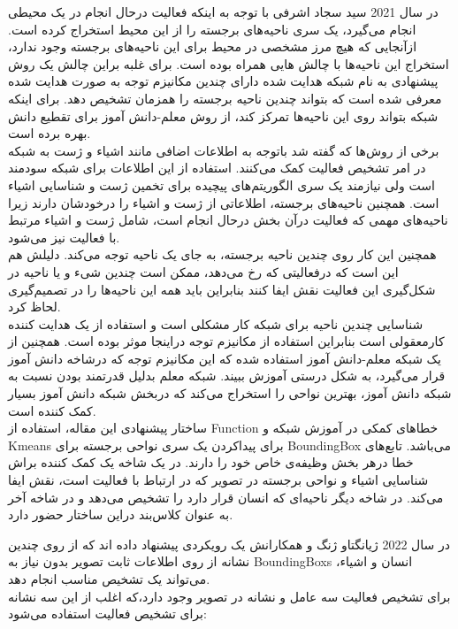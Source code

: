 در سال 2021 سید سجاد اشرفی %
\cite{action_multi_att_weakly}
با توجه به اینکه فعالیت درحال انجام در یک محیطی انجام می‌گیرد، یک سری ناحیه‌های برجسته را از این محیط استخراج کرده است. ازآنجایی که هیچ مرز مشخصی در محیط برای این ناحیه‌های برجسته وجود ندارد،‌ استخراج این ناحیه‌ها با چالش هایی همراه بوده است. برای غلبه براین چالش یک روش پیشنهادی به نام شبکه هدایت شده دارای چندین مکانیزم توجه به صورت هدایت شده معرفی شده است که بتواند چندین ناحیه برجسته را همزمان تشخیص دهد.
 برای اینکه شبکه بتواند روی این ناحیه‌ها تمرکز کند، از روش معلم-دانش آموز برای تقطیع دانش بهره برده است. \\
 برخی از روش‌ها که گفته شد باتوجه به اطلاعات اضافی مانند اشیاء و ژست به شبکه در امر تشخیص فعالیت کمک می‌کنند. استفاده از این اطلاعات برای شبکه سودمند است ولی نیازمند یک سری الگوریتم‌های پیچیده برای تخمین ژست و شناسایی اشیاء است. همچنین ناحیه‌های برجسته، اطلاعاتی از ژست و اشیاء را درخودشان دارند زیرا ناحیه‌های مهمی که فعالیت درآن بخش درحال انجام است،‌ شامل ژست و اشیاء مرتبط با فعالیت نیز می‌شود.\\
 همچنین این کار روی چندین ناحیه برجسته،‌ به جای یک ناحیه توجه می‌کند. دلیلش هم این است که درفعالیتی که رخ می‌دهد،‌ ممکن است چندین شیء و یا ناحیه در شکل‌گیری این فعالیت نقش ایفا کنند بنابراین باید همه این ناحیه‌ها را در تصمیم‌گیری لحاظ کرد.\\
شناسایی چندین ناحیه برای شبکه کار مشکلی است و استفاده از یک هدایت کننده کارمعقولی است بنابراین استفاده از مکانیزم توجه دراینجا موثر بوده است. همچنین از یک شبکه معلم-دانش آموز استفاده شده که این مکانیزم توجه که درشاخه دانش آموز قرار می‌گیرد، به شکل درستی آموزش ببیند. شبکه معلم بدلیل قدرتمند بودن نسبت به شبکه دانش آموز،‌ بهترین نواحی را استخراج می‌کند که دربخش شبکه دانش آموز بسیار کمک کننده است.\\
ساختار پیشنهادی این مقاله،‌ استفاده از %
\gls{Function}
 خطاهای
کمکی در آموزش شبکه و Kmeans%
برای پیداکردن یک سری نواحی برجسته برای %
\gls{BoundingBox}
 می‌باشد. تابع‌های خطا درهر بخش وظیفه‌ی خاص خود را دارند. در یک شاخه یک کمک کننده براش شناسایی اشیاء و نواحی برجسته در تصویر که در ارتباط با فعالیت است، نقش ایفا می‌کند. در شاخه دیگر ناحیه‌ای که انسان قرار دارد را تشخیص می‌دهد و در شاخه آخر به عنوان کلاس‌بند دراین ساختار حضور دارد.

در سال 2022 ژیانگتاو ژنگ و همکارانش %
\cite{Human_action_multiple_s_clue}
یک رویکردی پیشنهاد داده اند که از روی چندین نشانه از روی اطلاعات ثابت تصویر بدون نیاز به %
\glspl{BoundingBox}
 انسان و اشیاء، می‌تواند یک تشخیص مناسب انجام دهد.\\
برای تشخیص فعالیت سه عامل و نشانه در تصویر وجود دارد،‌که اغلب از این سه نشانه برای تشخیص فعالیت استفاده می‌شود:

